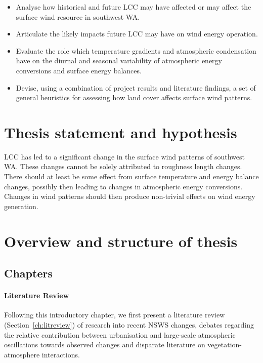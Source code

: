 \begin{itemize}
	\item Analyse how historical and future \ac{LCC} may have affected or may affect the surface wind resource in southwest \ac{WA}.
	\item Articulate the likely impacts future \ac{LCC} may have on wind energy operation.
	\item Evaluate the role which temperature gradients and atmospheric condensation have on the diurnal and seasonal variability of atmospheric energy conversions and surface energy balances.
	\item Devise, using a combination of project results and literature findings, a set of general heuristics for assessing how land cover affects surface wind patterns.
\end{itemize}

\section{Thesis statement and hypothesis}

\ac{LCC} has led to a significant change in the surface wind patterns of southwest \ac{WA}. These changes cannot be solely attributed to roughness length changes. There should at least be some effect from surface temperature and energy balance changes, possibly then leading to changes in atmospheric energy conversions. Changes in wind patterns should then produce non-trivial effects on wind energy generation.

\section{Overview and structure of thesis}

\subsection{Chapters}

\paragraph{Literature Review}

Following this introductory chapter, we first present a literature review (Section~\ref{ch:litreview}) of research into recent \ac{NSWS} changes, debates regarding the relative contribution between urbanisation and large-scale atmospheric oscillations towards observed changes and disparate literature on vegetation-atmosphere interactions.

